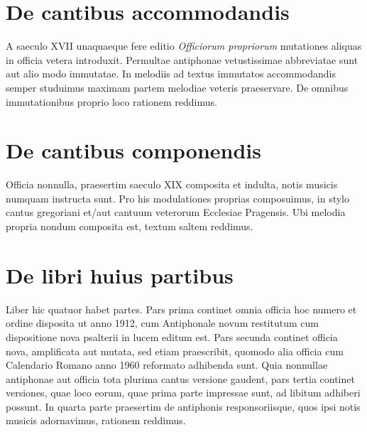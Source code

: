 \section*{De cantibus accommodandis}
A saeculo XVII unaquaeque fere editio \emph{Officiorum propriorum}
mutationes aliquas in officia vetera introduxit.
Permultae antiphonae vetustissimae abbreviatae sunt aut
alio modo immutatae.
In melodiis ad textus immutatos accommodandis semper studuimus
maximam partem melodiae veteris praeservare.
De omnibus immutationibus proprio loco rationem reddimus.

\section*{De cantibus componendis}
Officia nonnulla, praesertim saeculo XIX composita et indulta,
notis musicis numquam instructa sunt.
Pro his modulationes proprias composuimus, in stylo cantus gregoriani
et/aut cantuum veterorum Ecclesiae Pragensis.
Ubi melodia propria nondum composita est, textum saltem reddimus.

\section*{De libri huius partibus}
Liber hic quatuor habet partes.
Pars prima continet omnia officia hoc numero et ordine disposita
ut anno 1912, cum Antiphonale novum restitutum
cum dispositione nova psalterii in lucem editum est.
Pars secunda continet officia nova, amplificata aut mutata,
sed etiam praescribit, quomodo alia officia cum
Calendario Romano anno 1960 reformato adhibenda sunt.
Quia nonnullae antiphonae aut officia tota plurima cantus versione
gaudent, pars tertia continet versiones, quae loco eorum,
quae prima parte impressae sunt, ad libitum adhiberi possunt.
In quarta parte praesertim de antiphonis responsoriisque,
quos ipsi notis musicis adornavimus, rationem reddimus.
